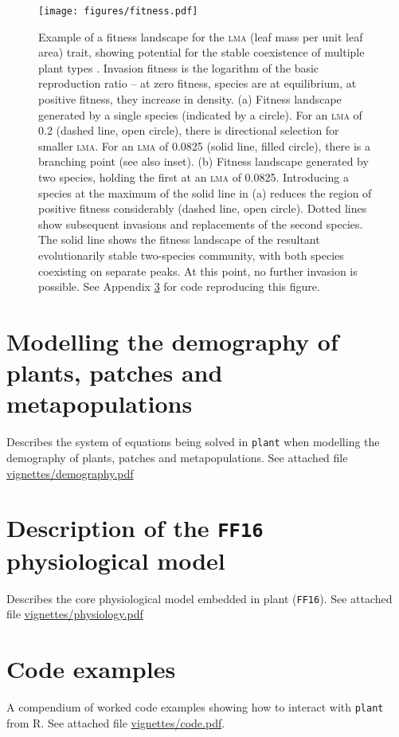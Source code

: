 \documentclass[a4paper,11pt]{article}
\newcommand{\plant}{\texttt{plant}}
\begin{document}
\begin{figure}[h!]
\centering
\texttt{[image: figures/fitness.pdf]}
\caption{Example of a fitness landscape for the \textsc{lma} (leaf mass per
 unit leaf area) trait, showing potential for the stable coexistence of
 multiple plant types \citep[adapted from][]{Falster-2015}. Invasion fitness is the
 logarithm of the basic reproduction ratio --
 at zero fitness, species are at equilibrium, at positive fitness, they increase in
 density. (a) Fitness landscape generated by a single species (indicated by
 a circle). For an \textsc{lma} of 0.2 (dashed line, open circle), there is
 directional selection for smaller \textsc{lma}. For an \textsc{lma} of
  0.0825 (solid line, filled circle), there is a branching point (see also inset). (b) Fitness landscape generated by two species, holding
 the first at an \textsc{lma} of 0.0825. Introducing a species at the
 maximum of the solid line in (a) reduces the region of positive
 fitness considerably (dashed line, open circle). Dotted lines show
 subsequent invasions and replacements of the second species. The
 solid line shows the fitness landscape of the resultant evolutionarily stable two-species community, with both species coexisting
 on separate peaks. At this point, no further
 invasion is possible. See Appendix \ref{sec:code} for code
 reproducing this figure.}
\label{fig:fitness}
\end{figure}

\clearpage
\setcounter{secnumdepth}{1}

\begin{appendices}\label{sec:appendices}

\section{Modelling the demography of plants, patches and metapopulations}\label{sec:demography}

Describes the system of equations being solved in {\plant} when modelling the demography of plants, patches and metapopulations. See attached file \url{vignettes/demography.pdf}

\section{Description of the \texttt{FF16} physiological model}\label{sec:FF16}

Describes the core physiological model embedded in plant (\texttt{FF16}). See attached file \url{vignettes/physiology.pdf}

\section{Code examples}\label{sec:code}

A compendium of worked code examples showing how to interact with {\plant} from R.
See attached file \url{vignettes/code.pdf}.

\end{appendices}
\end{document}
